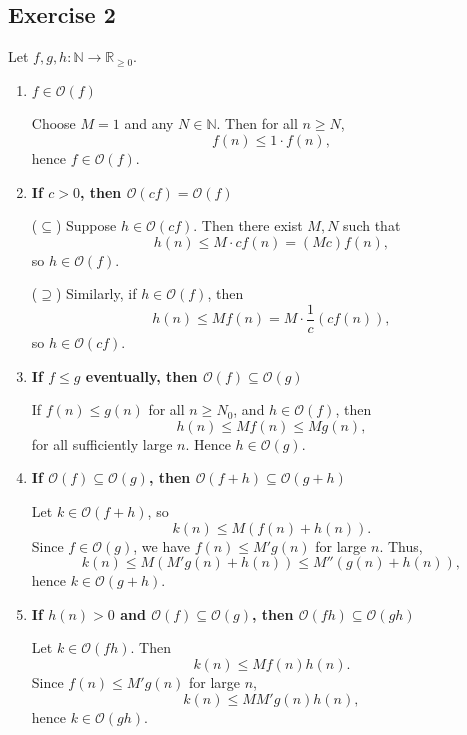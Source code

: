 \documentclass{article}
\theoremstyle{theorem}
\theoremstyle{definition}
\theoremstyle{remark}
\begin{document}
\subsection*{Exercise 2}

Let $f,g,h : \mathbb{N} \to \mathbb{R}_{\geq 0}$.

\begin{enumerate}
    \item \textbf{$f \in \mathcal{O}(f)$}

    Choose $M = 1$ and any $N \in \mathbb{N}$. Then for all $n \geq N$,
    \[
    f(n) \leq 1 \cdot f(n),
    \]
    hence $f \in \mathcal{O}(f)$.

    \item \textbf{If $c > 0$, then $\mathcal{O}(c f) = \mathcal{O}(f)$}

    ($\subseteq$) Suppose $h \in \mathcal{O}(c f)$. Then there exist $M,N$ such that
    \[
    h(n) \leq M \cdot c f(n) = (Mc) f(n),
    \]
    so $h \in \mathcal{O}(f)$.

    ($\supseteq$) Similarly, if $h \in \mathcal{O}(f)$, then
    \[
    h(n) \leq M f(n) = M \cdot \frac{1}{c} (c f(n)),
    \]
    so $h \in \mathcal{O}(c f)$.

    \item \textbf{If $f \leq g$ eventually, then $\mathcal{O}(f) \subseteq \mathcal{O}(g)$}

    If $f(n) \leq g(n)$ for all $n \geq N_0$, and $h \in \mathcal{O}(f)$, then
    \[
    h(n) \leq M f(n) \leq M g(n),
    \]
    for all sufficiently large $n$. Hence $h \in \mathcal{O}(g)$.

    \item \textbf{If $\mathcal{O}(f) \subseteq \mathcal{O}(g)$, then $\mathcal{O}(f+h) \subseteq \mathcal{O}(g+h)$}

    Let $k \in \mathcal{O}(f+h)$, so
    \[
    k(n) \leq M(f(n)+h(n)).
    \]
    Since $f \in \mathcal{O}(g)$, we have $f(n) \leq M' g(n)$ for large $n$. Thus,
    \[
    k(n) \leq M(M'g(n) + h(n)) \leq M''(g(n)+h(n)),
    \]
    hence $k \in \mathcal{O}(g+h)$.

    \item \textbf{If $h(n) > 0$ and $\mathcal{O}(f) \subseteq \mathcal{O}(g)$, then $\mathcal{O}(fh) \subseteq \mathcal{O}(gh)$}

    Let $k \in \mathcal{O}(fh)$. Then
    \[
    k(n) \leq M f(n)h(n).
    \]
    Since $f(n) \leq M' g(n)$ for large $n$,
    \[
    k(n) \leq MM' g(n)h(n),
    \]
    hence $k \in \mathcal{O}(gh)$.
\end{enumerate}
\end{document}
